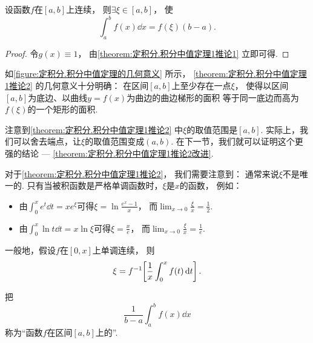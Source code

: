 \begin{corollary}\label{theorem:定积分.积分中值定理1推论2}
设函数\(f\)在\([a,b]\)上连续，
则\(\exists\xi\in[a,b]\)，
使\begin{equation}
	\int_a^b f(x) \dd{x} = f(\xi) (b-a).
\end{equation}
\begin{proof}
令\(g(x) \equiv 1\)，
由\cref{theorem:定积分.积分中值定理1推论1} 立即可得.
\end{proof}
\end{corollary}
\begin{remark}
如\cref{figure:定积分.积分中值定理的几何意义} 所示，
\cref{theorem:定积分.积分中值定理1推论2} 的几何意义十分明确：
在区间\([a,b]\)上至少存在一点\(\xi\)，
使得以区间\([a,b]\)为底边、以曲线\(y=f(x)\)为曲边的曲边梯形的面积
等于同一底边而高为\(f(\xi)\)的一个矩形的面积.
\end{remark}
\begin{remark}
注意到\cref{theorem:定积分.积分中值定理1推论2} 中\(\xi\)的取值范围是\([a,b]\).
实际上，我们可以舍去端点，让\(\xi\)的取值范围变成\((a,b)\).
在下一节，我们就可以证明这个更强的结论 --- \cref{theorem:定积分.积分中值定理1推论2改进}.
\end{remark}
\begin{remark}
对于\cref{theorem:定积分.积分中值定理1推论2}，
我们需要注意到：
通常来说\(\xi\)不是唯一的.
只有当被积函数是严格单调函数时，\(\xi\)是\(x\)的函数，
例如：\begin{itemize}
	\item 由\(\int_0^x e^t \dd{t} = x e^\xi\)可得\(\xi = \ln\frac{e^x-1}{x}\)，
	而\(\lim_{x\to0} \frac{\xi}{x} = \frac12\).
	\item 由\(\int_0^x \ln t \dd{t} = x \ln\xi\)可得\(\xi = \frac{x}{e}\)，
	而\(\lim_{x\to0} \frac{\xi}{x} = \frac1e\).
\end{itemize}

一般地，假设\(f\)在\([0,x]\)上单调连续，
则\[
	\xi = f^{-1}\kern-2pt\left[ \frac1x \int_0^x f(t) \dd{t} \right].
\]
\end{remark}
\begin{definition}
把\begin{equation}
	\frac{1}{b-a} \int_a^b f(x) \dd{x}
\end{equation}
称为“函数\(f\)在区间\([a,b]\)上的”.
\end{definition}

